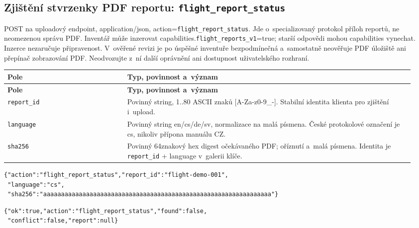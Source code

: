 \documentclass[11pt,a4paper]{article}
\newcommand{\codeword}[1]{\nolinkurl{#1}}
\begin{document}
\subsection{\texorpdfstring{Zjištění stvrzenky PDF reportu: \codeword{flight_report_status}}{Zjištění stvrzenky PDF reportu: flight\_report\_status}}

\label{api352:flight-report-status}

POST na uploadový endpoint, application/json, action=\codeword{flight_report_status}. Jde
o~specializovaný protokol příloh reportů, ne neomezenou správu PDF. Inventář může inzerovat
capabilities.\codeword{flight_reports_v1}=true; starší odpovědi mohou capabilities vynechat.
Inzerce nezaručuje připravenost. V~ověřené revizi je po úspěšné inventuře bezpodmínečná
a~samostatně neověřuje PDF úložiště ani přepínač zobrazování PDF. Neodvozujte z~ní další
oprávnění ani dostupnost uživatelského rozhraní.

\begin{longtable}{@{}>{\RaggedRight\arraybackslash}p{0.28\linewidth}>{\RaggedRight\arraybackslash}p{0.67\linewidth}@{}}
\toprule
\textbf{Pole} & \textbf{Typ, povinnost a~význam} \\
\midrule
\endfirsthead
\toprule
\textbf{Pole} & \textbf{Typ, povinnost a~význam} \\
\midrule
\endhead
\bottomrule
\endfoot
\codeword{report_id} & Povinný string, 1..80 ASCII znaků [A-Za-z0-9\_-]. Stabilní identita
klienta pro zjištění i~upload. \\
\codeword{language} & Povinný string en/cs/de/sv, normalizace na malá písmena. České
protokolové označení je cs, nikoliv přípona manuálu CZ. \\
\codeword{sha256} & Povinný 64znakový hex digest očekávaného PDF; oříznutí a~malá písmena.
Identita je \codeword{report_id} + language v~galerii klíče. \\
\end{longtable}

\begin{lstlisting}[language={}]
{"action":"flight_report_status","report_id":"flight-demo-001",
 "language":"cs",
 "sha256":"aaaaaaaaaaaaaaaaaaaaaaaaaaaaaaaaaaaaaaaaaaaaaaaaaaaaaaaaaaaaaaaa"}
\end{lstlisting}

\begin{lstlisting}[language={}]
{"ok":true,"action":"flight_report_status","found":false,
 "conflict":false,"report":null}
\end{lstlisting}
\end{document}
